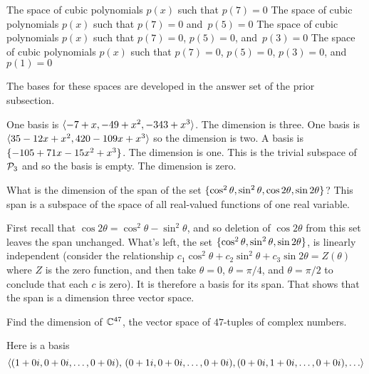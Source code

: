 \begin{exercises}
\begin{exparts}
      \partsitem  The space of cubic polynomials $p(x)$ such
        that $p(7)=0$
      \partsitem  The space of cubic polynomials $p(x)$ such
        that $p(7)=0$ and~$p(5)=0$
      \partsitem  The space of cubic polynomials $p(x)$ such
        that $p(7)=0$, $p(5)=0$, and~$p(3)=0$
      \partsitem  The space of cubic polynomials $p(x)$ such
        that $p(7)=0$, $p(5)=0$, $p(3)=0$, and~$p(1)=0$
    \end{exparts}
    \begin{answer}
      The bases for these spaces are developed 
      in the answer set of the prior subsection.
      \begin{exparts}
        \partsitem One basis is \( \langle-7+x,-49+x^2,-343+x^3\rangle \).
          The dimension is three.
        \partsitem One basis is $\langle35-12x+x^2,420-109x+x^3\rangle$ so the
          dimension is two.
        \partsitem A basis is $\mbox{$\{-105+71x-15x^2+x^3\}$}$.
          The dimension is one.
        \partsitem This is the trivial subspace of $\mathcal{P}_3$ and so the 
          basis is empty.
          The dimension is zero.
      \end{exparts}  
    \end{answer}
  \item 
     What is the dimension of the span of the set 
     $\mbox{$\{\cos^2\theta,\sin^2\theta,\cos2\theta,\sin2\theta\}$}$?
     This span is a subspace of the space of all real-valued functions of 
     one real variable.
     \begin{answer}
       First recall that $\cos2\theta=\cos^2\theta-\sin^2\theta$, and so 
       deletion of $\cos2\theta$ from this set leaves the span unchanged.
       What's left, the set  
       $\mbox{$\{\cos^2\theta,\sin^2\theta,\sin2\theta\}$}$, is linearly independent
       (consider the relationship
       $c_1\cos^2\theta+c_2\sin^2\theta+c_3\sin2\theta=Z(\theta)$
       where $Z$ is the zero function, and then take
       $\theta=0$, $\theta=\pi/4$, and $\theta=\pi/2$ to conclude that
       each $c$ is zero).
       It is therefore a basis for its span.
       That shows that the span is a dimension three vector space.
     \end{answer}
  \item  
    Find the dimension of \( \mathbb{C}^{47} \), the vector space
    of $47$-tuples of complex numbers.
    \begin{answer}
      Here is a basis
      \begin{equation*}
        \sequence{(1+0i,0+0i,\dots,0+0i),\,
                  (0+1i,0+0i,\dots,0+0i),(0+0i,1+0i,\dots,0+0i),\ldots }

\end{equation*}
\end{answer}
\end{exercises}
